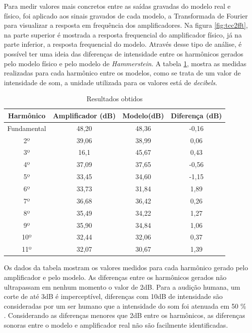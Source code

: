 Para medir valores mais concretos entre as saídas gravadas do modelo real e físico, foi aplicado aos sinais gravados de cada modelo, a Transformada de Fourier para visualizar a resposta em frequência dos amplificadores. Na figura \ref{fig:tcc2fft}, na parte superior é mostrada a resposta frequencial do amplificador físico, já na parte inferior, a resposta frequencial do modelo. Através desse tipo de análise, é possível ter uma ideia das diferenças de intensidade entre os harmônicos gerados pelo modelo físico e pelo modelo de \textit{Hammerstein}. A tabela \ref{tab01}, mostra as medidas realizadas para cada harmônico entre os modelos, como se trata de um valor de intensidade de som, a unidade utilizada para os valores está de \textit{decibels}.
\begin{table}[ht]
	\centering
	
	\caption{Resultados obtidos}
	\label{tab01}
	
	\begin{tabular}{cccc}
	
		\toprule
		\textbf{Harmônico} & \textbf{Amplificador (dB)} & \textbf{Modelo(dB)} & \textbf{Diferença (dB)} \\
		\midrule
		Fundamental & 48,20 & 48,36 & -0,16  \\
		2º & 39,06 & 38,99 & 0,06  \\
		3º & 16,1 & 45,67 & 0,43\\
		4º & 37,09 & 37,65 & -0,56\\
		5º & 33,45 & 34,60 & -1,15 \\ 
		6º & 33,73 & 31,84 & 1,89 \\ 
		7º & 36,68 & 36,42 & 0,26 \\ 
		8º & 35,49 & 34,22 & 1,27 \\ 
		9º & 35,90 & 34,84 & 1,06\\ 
		10º & 32,44 & 32,06 & 0,37 \\ 
		11º & 32,07 & 30,67 & 1,39\\
		\bottomrule
	\end{tabular}

\end{table}
Os dados da tabela mostram os valores medidos para cada harmônico gerado pelo amplificador e pelo modelo. As diferenças entre os harmônicos gerados não ultrapassam em nenhum momento o valor de 2dB. Para a audição humana, um corte de até 3dB é imperceptível, diferenças com 10dB de intensidade são consideradas por um ser humano que a intensidade do som foi atenuada em 50 \% \cite{eguiluz2000essential}. Considerando as diferenças menores que 2dB entre os harmônicos, as diferenças sonoras entre o modelo e amplificador real não são facilmente identificadas.




